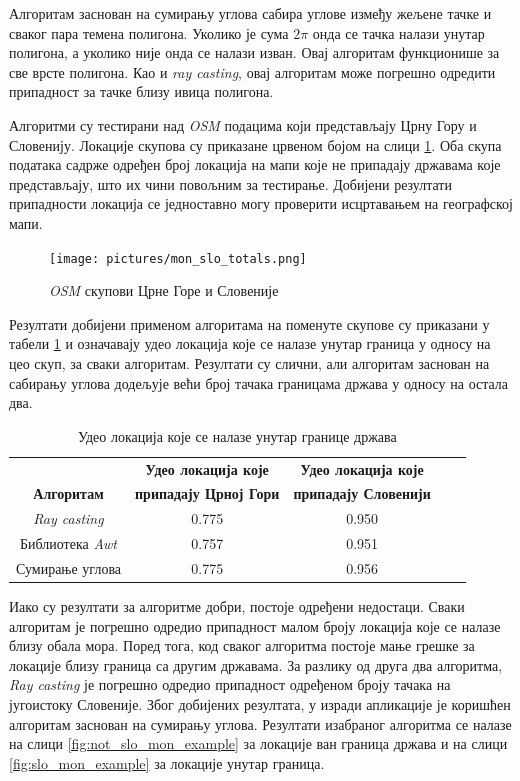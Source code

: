 \documentclass[12pt,oneside]{memoir}
\begin{document}
Алгоритам заснован на сумирању углова сабира углове између жељене тачке и сваког пара темена полигона. Уколико је сума $2\pi$ онда се тачка налази унутар полигона, а уколико није онда се налази изван. Овај алгоритам функционише за све врсте полигона. Као и  \textit{ray casting}, овај алгоритам може погрешно одредити припадност за тачке близу ивица полигона.

Алгоритми су тестирани над \textit{OSM} подацима који представљају Црну Гору и Словенију. Локације скупова су приказане црвеном бојом на слици \ref{fig:all_map_slo_mon_example}. Оба скупа података садрже одређен број локација на мапи које не припадају државама које представљају, што их чини повољним за тестирање. Добијени резултати припадности локација се једноставно могу проверити исцртавањем на географској мапи.

\begin{figure}[!ht]
  \centering
  \texttt{[image: pictures/mon\_slo\_totals.png]}
  \caption{\textit{OSM} скупови Црне Горе и Словеније}
  \label{fig:all_map_slo_mon_example}
\end{figure}

Резултати добијени применом алгоритама на поменуте скупове су приказани у табели \ref{tab:tabla_rez_poly_cont_algor} и означавају удео локација које се налазе унутар граница у односу на цео скуп, за сваки алгоритам. Резултати су слични, али алгоритам заснован на сабирању углова додељује већи број тачака границама држава у односу на остала два.

\begin{table}[h!]
\begin{center}
\begin{tabular}{|c|c|c|c|c|} \hline
\textbf{ } & \textbf{Удео локација које} & \textbf{Удео локација које} \\
\textbf{Алгоритам} & \textbf{припадају Црној Гори} & \textbf{припадају Словенији} \\ \hline
\textit{Ray casting} & 0.775 & 0.950 \\ \hline
Библиотека \textit{Awt} & 0.757 & 0.951 \\ \hline
Сумирање углова & 0.775 & 0.956 \\ \hline
\end{tabular}
\caption{Удео локација које се налазе унутар границе држава}
\label{tab:tabla_rez_poly_cont_algor}
\end{center}
\end{table}

Иако су резултати за алгоритме добри, постоје одређени недостаци. Сваки алгоритам је погрешно одредио припадност малом броју локација које се налазе близу обала мора. Поред тога, код сваког алгоритма постоје мање грешке за локације близу граница са другим државама. За разлику од друга два алгоритма, \textit{Ray casting} је погрешно одредио припадност одређеном броју тачака на југоистоку Словеније. Због добијених резултата, у изради апликације је коришћен алгоритам заснован на сумирању углова. Резултати изабраног алгоритма се налазе на слици \ref{fig:not_slo_mon_example} за локације ван граница држава и на слици \ref{fig:slo_mon_example} за локације унутар граница.
\end{document}
